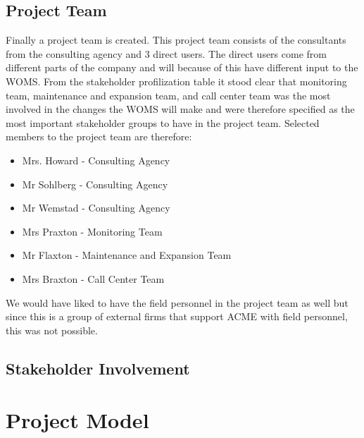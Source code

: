 \documentclass[a4paper]{article}
\begin{document}
\subsection{Project Team}
\label{sub:project_team}
Finally a project team is created. This project team consists of the consultants from the consulting agency and 3 direct users. The direct users come from different parts of the company and will because of this have different input to the WOMS. From the stakeholder profilization table it stood clear that monitoring team, maintenance and expansion team, and call center team was the most involved in the changes the WOMS will make and were therefore specified as the most important stakeholder groups to have in the project team. Selected members to the project team are therefore:
\begin{itemize}
\item Mrs. Howard		- Consulting Agency
\item Mr Sohlberg	- Consulting Agency
\item Mr Wemstad	- Consulting Agency
\item Mrs Praxton		- Monitoring Team
\item Mr Flaxton		- Maintenance and Expansion Team
\item Mrs Braxton		- Call Center Team
\end{itemize}


We would have liked to have the field personnel in the project team as well but since this is a group of  external firms that support ACME with field personnel, this was not possible.

\subsection{Stakeholder Involvement}
\label{stakeholder_involvment}



\section{Project Model} 
\label{sec:project_model}
\end{document}
